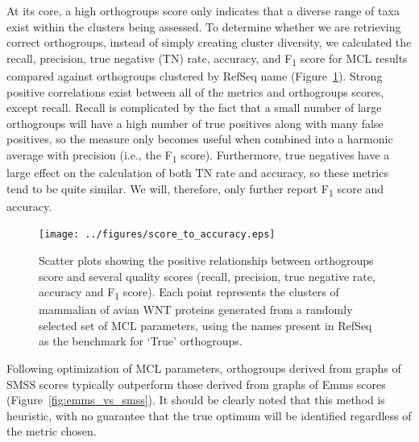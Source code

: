 \documentclass[twocolumn]{bmcart}  %
\begin{document}
At its core, a high orthogroups score only indicates that a diverse range of taxa exist within the clusters being assessed.
To determine whether we are retrieving correct orthogroups, instead of simply creating cluster diversity, we calculated the recall, precision, true negative (TN) rate, accuracy, and F\textsubscript{1} score for MCL results compared against orthogroups clustered by RefSeq name (Figure~\ref{fig:score_to_accuracy}).
Strong positive correlations exist between all of the metrics and orthogroups scores, except recall.
Recall is complicated by the fact that a small number of large orthogroups will have a high number of true positives along with many false positives, so the measure only becomes useful when combined into a harmonic average with precision (i.e., the F\textsubscript{1} score).
Furthermore, true negatives have a large effect on the calculation of both TN rate and accuracy, so these metrics tend to be quite similar.
We will, therefore, only further report F\textsubscript{1} score and accuracy.

\begin{figure}[t]
  \begin{center}
  \texttt{[image: ../figures/score\_to\_accuracy.eps]}
\end{center}
\caption{Scatter plots showing the positive relationship between orthogroups score and several quality scores (recall, precision, true negative rate, accuracy and F\textsubscript{1} score).
Each point represents the clusters of mammalian of avian WNT proteins generated from a randomly selected set of MCL parameters, using the names present in RefSeq as the benchmark for `True' orthogroups.}
\label{fig:score_to_accuracy}
\end{figure}


Following optimization of MCL parameters, orthogroups derived from graphs of SMSS scores typically outperform those derived from graphs of Emms scores (Figure~\ref{fig:emms_vs_smss}).
It should be clearly noted that this method is heuristic, with no guarantee that the true optimum will be identified regardless of the metric chosen.
\end{document}
